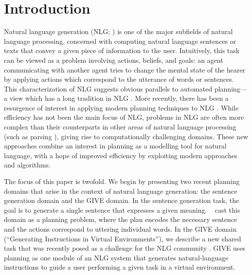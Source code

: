 
\section{Introduction}
\label{sec:introduction}

Natural language generation (NLG; \citeauthor{reiter00building}
\citeyear{reiter00building}) is one of the major subfields of natural
language processing, concerned with computing natural language sentences or
texts that convey a given piece of information to the user. Intuitively,
this task can be viewed as a problem involving actions, beliefs, and goals:
an agent communicating with another agent tries to change the mental state
of the hearer by applying actions which correspond to the utterance of
words or sentences. This characterization of NLG suggests obvious parallels
to automated planning---a view which has a long tradition in NLG
\cite{appelt:planning,young94dpocl}.  More recently, there has been a
resurgence of interest in applying modern planning techniques to NLG
\cite{Steedman-Petrick:07,KolSto07,benotti08b}.  While efficiency has not
been the main focus of NLG, problems in NLG are often more complex than
their counterparts in other areas of natural language processing (such as
parsing \cite{KolStr02}), giving rise to computationally challenging
domains. These new approaches combine an interest in planning as a
modelling tool for natural language, with a hope of improved efficiency by
exploiting modern approaches and algorithms.

The focus of this paper is twofold. We begin by presenting two recent
planning domains that arise in the context of natural language generation:
the sentence generation domain and the GIVE domain. In the sentence
generation task, the goal is to generate a single sentence that expresses a
given meaning. \citeauthor{KolSto07}~ cast this domain
as a planning problem, where the plan encodes the necessary sentence and
the actions correspond to uttering individual words. In the GIVE domain
(``Generating Instructions in Virtual Environments''), we describe a new
shared task that was recently posed as a challenge for the NLG community
\cite{alexander07:_shared_task_propos}. GIVE uses planning as one module of
an NLG system that generates natural-language instructions to guide a
user performing a given task in a virtual environment.

